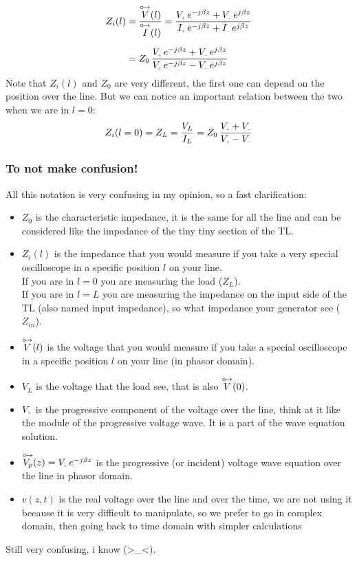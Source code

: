 \begin{align}
    \begin{split}\label{eq:input_impedance}
      Z_i(l)&=\frac{\phas{V}(l)}{\phas{I}(l)}=\frac{V\bottomPlus \,e^{-j\beta z}+V\bottomMinus \,e^{j\beta z}}{I\bottomPlus \,e^{-j\beta z}+I\bottomMinus \,e^{j\beta z}}\\[5pt]
      &=Z_0\,\frac{V\bottomPlus \,e^{-j\beta z}+V\bottomMinus \,e^{j\beta z}}{V\bottomPlus \,e^{-j\beta z}-V\bottomMinus \,e^{j\beta z}}
    \end{split}
\end{align}
Note that $Z_i(l)$ and $Z_0$ are very different, the first one can depend on the position over the line. But we can notice an important relation between the two when we are in $l=0$:
\begin{equation}\label{eq:input_impedance_l=0}
    Z_i(l=0)=Z_L=\frac{V_L}{I_L}=Z_0 \,\frac{V\bottomPlus +V\bottomMinus }{V\bottomPlus -V\bottomMinus }
\end{equation}
\subsubsection*{To not make confusion!}
All this notation is very confusing in my opinion, so a fast clarification:
\begin{itemize}
    \item $Z_0$ is the characteristic impedance, it is the same for all the line and can be considered like the impedance of the tiny tiny section of the TL.
    \item $Z_i(l)$ is the impedance that you would measure if you take a very special oscilloscope in a specific position $l$ on your line.\\
    If you are in $l=0$ you are measuring the load ($Z_L$).\\
    If you are in $l=L$ you are measuring the impedance on the input side of the TL (also named input impedance), so what impedance your generator see ($Z_{in}$).
    \item $\overset{\mathbin {{\circ \mkern-2.5mu\rightarrow}}}{V}(l)$ is the voltage that you would measure if you take a special oscilloscope in a specific position $l$ on your line (in phasor domain).
    \item $V_L$ is the voltage that the load see, that is also $\overset{\mathbin {{\circ \mkern-2.5mu\rightarrow}}}{V}(0)$.
    \item $V\bottomPlus$ is the progressive component of the voltage over the line, think at it like the module of the progressive voltage wave. It is a part of the wave equation solution. 
    \item $\phas{V_p}(z)=V\bottomPlus \,e^{-j\beta z}$ is the progressive (or incident) voltage wave equation over the line in phasor domain.
    \item $v(z,t)$ is the real voltage over the line and over the time, we are not using it because it is very difficult to manipulate, so we prefer to go in complex domain, then going back to time domain with simpler calculations
\end{itemize}
Still very confusing, i know (\textgreater\_\textless).

